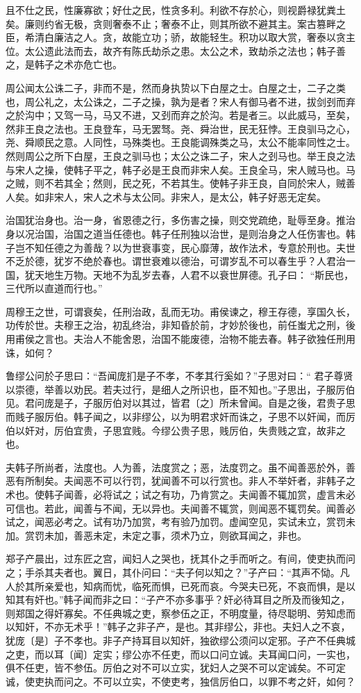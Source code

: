 \documentclass[]{article}
\begin{document}
且不仕之民，性廉寡欲；好仕之民，性贪多利。利欲不存於心，则视爵禄犹粪土矣。廉则约省无极，贪则奢泰不止；奢泰不止，则其所欲不避其主。案古篡畔之臣，希清白廉洁之人。贪，故能立功；骄，故能轻生。积功以取大赏，奢泰以贪主位。太公遗此法而去，故齐有陈氏劫杀之患。太公之术，致劫杀之法也；韩子善之，是韩子之术亦危亡也。

周公闻太公诛二子，非而不是，然而身执贽以下白屋之士。白屋之士，二子之类也，周公礼之，太公诛之，二子之操，孰为是者？宋人有御马者不进，拔剑刭而弃之於沟中；又驾一马，马又不进，又刭而弃之於沟。若是者三。以此威马，至矣，然非王良之法也。王良登车，马无罢驽。尧、舜治世，民无狂悖。王良驯马之心，尧、舜顺民之意。人同性，马殊类也。王良能调殊类之马，太公不能率同性之士。然则周公之所下白屋，王良之驯马也；太公之诛二子，宋人之刭马也。举王良之法与宋人之操，使韩子平之，韩子必是王良而非宋人矣。王良全马，宋人贼马也。马之贼，则不若其全；然则，民之死，不若其生。使韩子非王良，自同於宋人，贼善人矣。如非宋人，宋人之术与太公同。非宋人，是太公，韩子好恶无定矣。

治国犹治身也。治一身，省恩德之行，多伤害之操，则交党疏绝，耻辱至身。推治身以况治国，治国之道当任德也。韩子任刑独以治世，是则治身之人任伤害也。韩子岂不知任德之为善哉？以为世衰事变，民心靡薄，故作法术，专意於刑也。夫世不乏於德，犹岁不绝於春也。谓世衰难以德治，可谓岁乱不可以春生乎？人君治一国，犹天地生万物。天地不为乱岁去春，人君不以衰世屏德。孔子曰：
``斯民也，三代所以直道而行也。''

周穆王之世，可谓衰矣，任刑治政，乱而无功。甫侯谏之，穆王存德，享国久长，功传於世。夫穆王之治，初乱终治，非知昏於前，才妙於後也，前任蚩尤之刑，後用甫侯之言也。夫治人不能舍恩，治国不能废德，治物不能去春。韩子欲独任刑用诛，如何？

鲁缪公问於子思曰：``吾闻庞扪是子不孝，不孝其行奚如？''子思对曰：``
君子尊贤以崇德，举善以劝民。若夫过行，是细人之所识也，臣不知也。''子思出，子服厉伯见。君问庞是子，子服厉伯对以其过，皆君〔之〕所未曾闻。自是之後，君贵子思而贱子服厉伯。韩子闻之，以非缪公，以为明君求奸而诛之，子思不以奸闻，而厉伯以奸对，厉伯宜贵，子思宜贱。今缪公贵子思，贱厉伯，失贵贱之宜，故非之也。

夫韩子所尚者，法度也。人为善，法度赏之；恶，法度罚之。虽不闻善恶於外，善恶有所制矣。夫闻恶不可以行罚，犹闻善不可以行赏也。非人不举奸者，非韩子之术也。使韩子闻善，必将试之；试之有功，乃肯赏之。夫闻善不辄加赏，虚言未必可信也。若此，闻善与不闻，无以异也。夫闻善不辄赏，则闻恶不辄罚矣。闻善必试之，闻恶必考之。试有功乃加赏，考有验乃加罚。虚闻空见，实试未立，赏罚未加。赏罚未加，善恶未定，未定之事，须术乃立，则欲耳闻之，非也。

郑子产晨出，过东匠之宫，闻妇人之哭也，抚其仆之手而听之。有间，使吏执而问之；手杀其夫者也。翼日，其仆问曰：``夫子何以知之？''子产曰：``其声不恸。凡人於其所亲爱也，知病而忧，临死而惧，已死而哀。今哭夫已死，不哀而惧，是以知其有奸也。''韩子闻而非之曰：``子产不亦多事乎？奸必待耳目之所及而後知之，则郑国之得奸寡矣。不任典城之吏，察参伍之正，不明度量，待尽聪明、劳知虑而以知奸，不亦无术乎！''韩子之非子产，是也。其非缪公，非也。夫妇人之不哀，犹庞〔是〕子不孝也。非子产持耳目以知奸，独欲缪公须问以定邪。子产不任典城之吏，而以耳〔闻〕定实；缪公亦不任吏，而以口问立诚。夫耳闻口问，一实也，俱不任吏，皆不参伍。厉伯之对不可以立实，犹妇人之哭不可以定诚矣。不可定诚，使吏执而问之。不可以立实，不使吏考，独信厉伯口，以罪不考之奸，如何？
\end{document}
